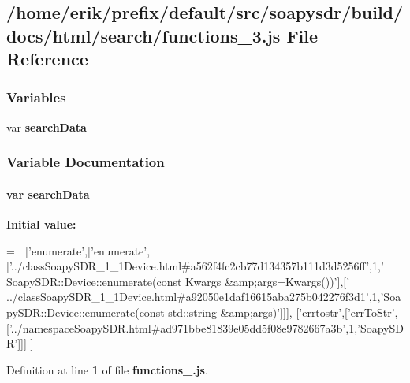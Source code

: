 \subsection{/home/erik/prefix/default/src/soapysdr/build/docs/html/search/functions\+\_\+3.js File Reference}
\label{functions__3_8js}
\subsubsection*{Variables}
\begin{DoxyCompactItemize}
\item 
var {\bf search\+Data}
\end{DoxyCompactItemize}


\subsubsection{Variable Documentation}
\paragraph[{search\+Data}]{\setlength{\rightskip}{0pt plus 5cm}var search\+Data}\label{functions__3_8js_ad01a7523f103d6242ef9b0451861231e}
{\bfseries Initial value\+:}
\begin{DoxyCode}
=
[
  [\textcolor{stringliteral}{'enumerate'},[\textcolor{stringliteral}{'enumerate'},[\textcolor{stringliteral}{'../classSoapySDR\_1\_1Device.html#a562f4fc2cb77d134357b111d3d5256ff'},1,\textcolor{stringliteral}{'
      SoapySDR::Device::enumerate(const Kwargs &amp;args=Kwargs())'}],[\textcolor{stringliteral}{'
      ../classSoapySDR\_1\_1Device.html#a92050e1daf16615aba275b042276f3d1'},1,\textcolor{stringliteral}{'SoapySDR::Device::enumerate(const std::string &amp;args)'}]]],
  [\textcolor{stringliteral}{'errtostr'},[\textcolor{stringliteral}{'errToStr'},[\textcolor{stringliteral}{'../namespaceSoapySDR.html#ad971bbe81839e05dd5f08e9782667a3b'},1,\textcolor{stringliteral}{'SoapySDR'}]]]
]
\end{DoxyCode}


Definition at line {\bf 1} of file {\bf functions\+\_.\+js}.

